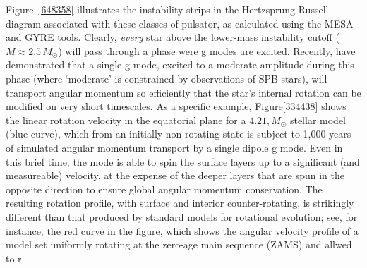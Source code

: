 Figure~\ref{648358} illustrates the instability strips in the Hertzsprung-Russell diagram associated with these classes of pulsator, as calculated using the MESA and GYRE tools. Clearly, \emph{every} star above the lower-mass instability cutoff ($M \approx 2.5\,M_{\odot}$) will pass through a phase were g modes are excited. Recently, \citet{Townsend:2017} have demonstrated that a single g mode, excited to a moderate amplitude during this phase (where `moderate' is constrained by observations of SPB stars), will transport angular momentum so efficiently that the star's internal rotation can be modified on very short timescales. As a specific example, Figure\ref{334438} shows the linear rotation velocity in the equatorial plane for a $4.21,M_{\odot}$ stellar model (blue curve), which from an initially non-rotating state is subject to 1,000 years of simulated angular momentum transport by a single dipole g mode. Even in this brief time, the mode is able to spin the surface layers up to a significant (and measureable) velocity, at the expense of the deeper layers that are spun in the opposite direction to ensure global angular momentum conservation. The resulting rotation profile, with surface and interior counter-rotating, is strikingly different than that produced by standard models for rotational evolution; see, for instance, the red curve in the figure, which shows the angular velocity profile of a model set uniformly rotating at the zero-age main sequence (ZAMS) and allwed to r


